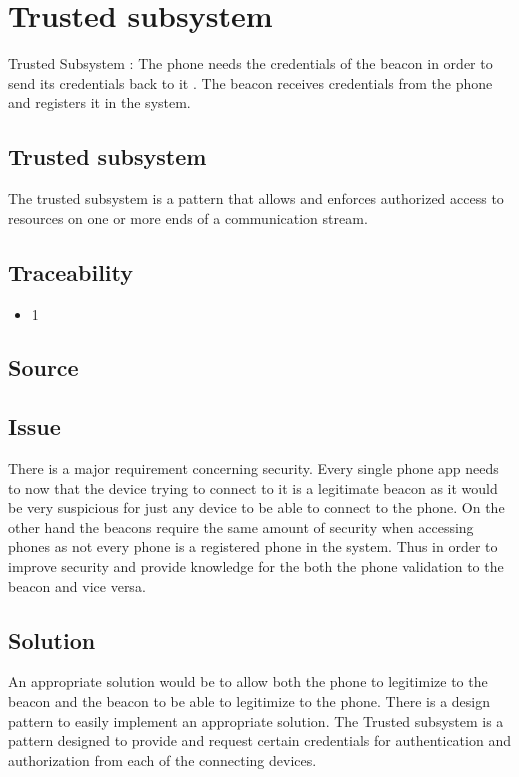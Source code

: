 

\section{Trusted subsystem}

Trusted Subsystem : The phone needs the credentials of the beacon in order to send its credentials back to it . The beacon receives credentials from the phone and registers it in the system. 
	
	\subsection{Trusted subsystem}
	The trusted subsystem is a pattern that allows and enforces authorized access to resources on one or more ends of a communication stream.


	\subsection{Traceability} 
		\begin{itemize}
			\item 1
		\end{itemize}

	\subsection{Source} \cite{book:design-patterns}

	\subsection{Issue} \label{trustedP:issue}

		There is a major requirement concerning security. Every single phone app needs to now that the device trying to connect to it is a legitimate beacon as it would be very suspicious for just any device to be able to connect to the phone. On the other hand the beacons require the same amount of security when accessing phones as not every phone is a registered phone in the system. Thus in order to improve security and provide knowledge for the both the phone validation to the beacon and vice versa.


	\subsection{Solution} 

		An appropriate solution would be to allow both the phone to legitimize to the beacon and the beacon to be able to legitimize to the phone. There is a design pattern to easily implement an appropriate solution. The Trusted subsystem is a pattern designed to provide and request certain credentials for authentication and authorization from each of the connecting devices.

